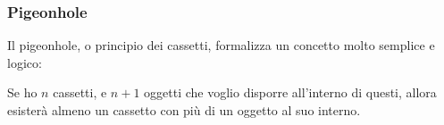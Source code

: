 \documentclass[11pt]{scrartcl}
\begin{document}
	\subsubsection{Pigeonhole}
	Il pigeonhole, o principio dei cassetti, formalizza un concetto molto semplice e logico: 
	\begin{proposition}[Pigeonhole]
		Se ho $n$ cassetti, e $n+1$ oggetti che voglio disporre all'interno di questi, allora esisterà almeno un cassetto con più di un oggetto al suo interno.
	\end{proposition}
	
\end{document}
